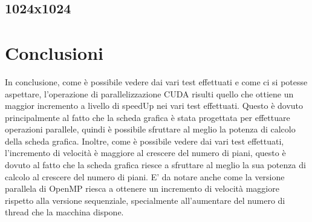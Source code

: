 \documentclass[11pt]{article}
\begin{document}
    \subsection{1024x1024}\label{subsec:1024x1024}


    \section{Conclusioni}\label{sec:conclusioni}
    In conclusione, come è possibile vedere dai vari test effettuati e come ci si potesse aspettare, l'operazione di
    parallelizzazione CUDA risulti quello che ottiene un maggior incremento a livello di speedUp nei vari test
    effettuati.
    Questo è dovuto principalmente al fatto che la scheda grafica è stata progettata per effettuare operazioni
    parallele, quindi è possibile sfruttare al meglio la potenza di calcolo della scheda grafica.
    Inoltre, come è possibile vedere dai vari test effettuati, l'incremento di velocità è maggiore al crescere del
    numero di piani, questo è dovuto al fatto che la scheda grafica riesce a sfruttare al meglio la sua potenza di
    calcolo al crescere del numero di piani.
    E' da notare anche come la versione parallela di OpenMP riesca a ottenere un incremento di velocità maggiore
    rispetto alla versione sequenziale, specialmente all'aumentare del numero di thread che la macchina dispone.

    \clearpage
\end{document}

